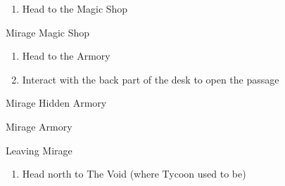 \begin{paracol}{2}
\begin{enumerate}[resume]
    \item Head to the Magic Shop
\end{enumerate}

\begin{shop}{Mirage Magic Shop}
    \varwb
    \begin{buy}
        \item {} \size
        \item {} \float
    \end{buy}
    \varwe
\end{shop}

\begin{enumerate}[resume]
    \item Head to the Armory
    \item Interact with the back part of the desk to open the passage
\end{enumerate}

\begin{shop}{Mirage Hidden Armory}
    \varwb
    \begin{buy}
        \item {} \runningShoes \space {}
    \end{buy}
    \varwe
\end{shop}

\switchcolumnTwice[*]
\begin{shop}{Mirage Armory}
    \varwb
    \begin{buy}
        \item {} \crystalShield \space {}
    \end{buy}
    \varwe
\end{shop}

\switchcolumn
\begin{steproute}{Leaving Mirage}
\end{steproute}

\switchcolumn
\begin{enumerate}[resume]
    \item Head north to The Void (where Tycoon used to be)
\end{enumerate}
    
\end{paracol}
\newpage